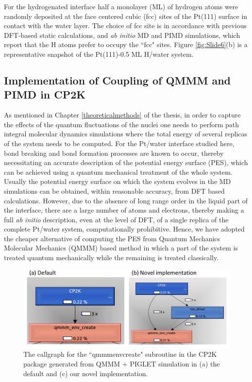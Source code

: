 For the hydrogenated interface half a monolayer (ML) of hydrogen atoms were randomly deposited at the face centered cubic (fcc) sites of the Pt(111) surface in contact with the water layer. The choice of fcc site is in accordance with previous DFT-based static calculations\cite{kronberg2020coupling,yan2018hydrogen}, and \textit{ab initio} MD\cite{kronberg2020coupling} and PIMD simulations\cite{yan2020nuclear}, which report that the H atoms prefer to occupy the ``fcc" sites. Figure \ref{fig:Slide6}(b) is a representative snapshot of the Pt(111)-0.5 ML H/water system. 

\subsection{Implementation of Coupling of QMMM and PIMD in CP2K}

As mentioned in Chapter \ref{theoreticalmethods} of the thesis, in order to capture the effects of
the quantum fluctuations of the nuclei one needs to perform path integral molecular
dynamics simulations where the total energy of several replicas of the system
needs to be computed. For the Pt/water interface studied here, 
bond breaking and bond formation processes are known to occur, thereby necessitating
an accurate description of the potential energy surface (PES), which
can be achieved using a quantum mechanical treatment of the whole system.
Usually the potential energy surface on which the system evolves in the MD
simulations can be obtained, within reasonable accuracy, from DFT based calculations.
However, due to the absence of long range order in the liquid part of the interface,
there are a large number of atoms and electrons, thereby making a full \textit{ab 
initio} description, even at the level of DFT, of a single replica
of the complete Pt/water system, computationally prohibitive. Hence, we have adopted the 
cheaper alternative of computing the PES from Quantum Mechanics Molecular Mechanics 
(QMMM) based method in which a part of the system is treated quantum mechanically
while the remaining is treated classically.

\begin{figure}
    \centering
    \includegraphics[width=15cm ]{./Chapter3/figures/Slide7.jpg}
    \caption{The callgraph for the ``qmmm\textunderscore env\textunderscore create" subroutine in the CP2K package generated from QMMM $+$ PIGLET simulation in (a) the default and (c) our novel implementation.}
    \label{fig:Slide7}
\end{figure}

